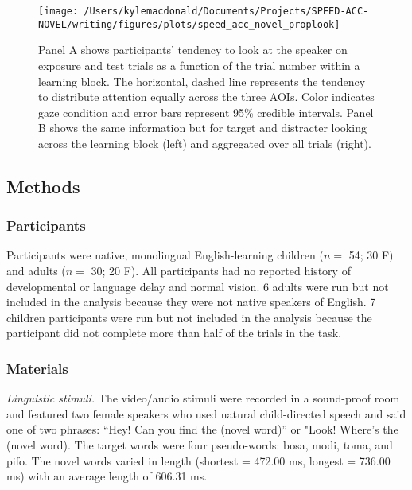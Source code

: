 \documentclass[10pt, letterpaper]{article}
\newenvironment{CodeChunk}{}{}
\begin{document}
\begin{CodeChunk}
\begin{figure*}[t]

{\centering \texttt{[image: /Users/kylemacdonald/Documents/Projects/SPEED-ACC-NOVEL/writing/figures/plots/speed\_acc\_novel\_proplook]} 

}

\caption[Panel A shows participants’ tendency to look at the speaker on exposure and test trials as a function of the trial number within a learning block]{Panel A shows participants’ tendency to look at the speaker on exposure and test trials as a function of the trial number within a learning block. The horizontal, dashed line represents the tendency to distribute attention equally across the three AOIs. Color indicates gaze condition and error bars represent 95\% credible intervals. Panel B shows the same information but for target and distracter looking across the learning block (left) and aggregated over all trials (right).}\label{fig:san-prop-looking-plot}
\end{figure*}
\end{CodeChunk}

\hypertarget{methods-1}{%
\subsection{Methods}\label{methods-1}}

\hypertarget{participants-1}{%
\subsubsection{Participants}\label{participants-1}}

Participants were native, monolingual English-learning children (\(n=\)
54; 30 F) and adults (\(n=\) 30; 20 F). All participants had no reported
history of developmental or language delay and normal vision. 6 adults
were run but not included in the analysis because they were not native
speakers of English. 7 children participants were run but not included
in the analysis because the participant did not complete more than half
of the trials in the task.

\hypertarget{materials-1}{%
\subsubsection{Materials}\label{materials-1}}

\emph{Linguistic stimuli.} The video/audio stimuli were recorded in a
sound-proof room and featured two female speakers who used natural
child-directed speech and said one of two phrases: ``Hey! Can you find
the (novel word)'' or "Look! Where's the (novel word). The target words
were four pseudo-words: bosa, modi, toma, and pifo. The novel words
varied in length (shortest = 472.00 ms, longest = 736.00 ms) with an
average length of 606.31 ms.
\end{document}
